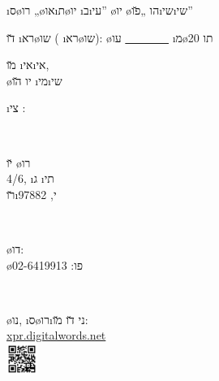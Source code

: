 \begin{center}
	\i{ס}\o{רו} „\o{או}\i{ת}\o{יו} \i{ב}\i{עי}” \o{יו} \o{הו} „\u{פו}\i{שי}\i{שי}”


	\u{דו} \i{רא}\o{שו} ( \i{רא}\o{שו}): \o{עו} \underline{~ ~ ~ ~ ~} \i{מ}\o{תו} 20

	\vfill

	\middlelinenormal

	\u{מו}  \i{אי}\i{אי},\\
	\o{יו} \u{הו} \i{מי}\i{שי}

	\vfill

	\middlelinenormal

	\i{צי} :

	~

	\u{יו} \o{רו}\\
	 4/6, \i{ג} \i{תי}\\
	\u{רו}\i{י}, 97882

	~

	\o{דו}: \\
	\o{פו}: 02-6419913

	~

	 \o{נו},  \i{ס}\o{רו}\i{ני} \u{דו} \u{מו}:\\
	\url{xpr.digitalwords.net}\\
	\includegraphics[width=1cm]{url-xpr.png}
\end{center}
